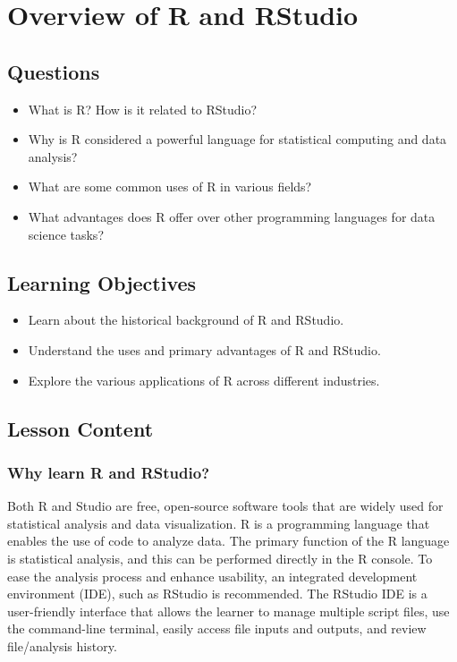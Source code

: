 \documentclass[
  letterpaper,
  DIV=11,
  numbers=noendperiod]{scrreprt}
\begin{document}

\chapter{Overview of R and RStudio}\label{sec-overview}

\section{Questions}\label{questions}

\begin{itemize}
\item
  What is R? How is it related to RStudio?
\item
  Why is R considered a powerful language for statistical computing and
  data analysis?
\item
  What are some common uses of R in various fields?
\item
  What advantages does R offer over other programming languages for data
  science tasks?
\end{itemize}

\section{Learning Objectives}\label{learning-objectives}

\begin{itemize}
\item
  Learn about the historical background of R and RStudio.
\item
  Understand the uses and primary advantages of R and RStudio.
\item
  Explore the various applications of R across different industries.
\end{itemize}

\section{Lesson Content}\label{lesson-content}

\subsection{Why learn R and RStudio?}\label{why-learn-r-and-rstudio}

Both R and Studio are free, open-source software tools that are widely
used for statistical analysis and data visualization. R is a programming
language that enables the use of code to analyze data. The primary
function of the R language is statistical analysis, and this can be
performed directly in the R console. To ease the analysis process and
enhance usability, an integrated development environment (IDE), such as
RStudio is recommended. The RStudio IDE is a user-friendly interface
that allows the learner to manage multiple script files, use the
command-line terminal, easily access file inputs and outputs, and review
file/analysis history.
\end{document}
